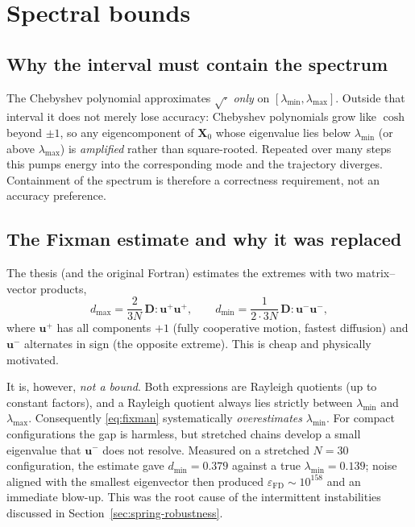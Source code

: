 \documentclass[11pt,a4paper]{report}
\newcommand{\D}{\bm{D}}
\begin{document}
\section{Spectral bounds}
\label{sec:spectral-bounds}

\subsection{Why the interval must contain the spectrum}

The Chebyshev polynomial approximates $\sqrt{\cdot}$ \emph{only} on
$[\lambda_{\min},\lambda_{\max}]$. Outside that interval it does not merely lose
accuracy: Chebyshev polynomials grow like $\cosh$ beyond $\pm1$, so any
eigencomponent of $\bm{X}_0$ whose eigenvalue lies below $\lambda_{\min}$ (or
above $\lambda_{\max}$) is \emph{amplified} rather than square-rooted. Repeated
over many steps this pumps energy into the corresponding mode and the trajectory
diverges. Containment of the spectrum is therefore a correctness requirement, not
an accuracy preference.

\subsection{The Fixman estimate and why it was replaced}

The thesis (and the original Fortran) estimates the extremes with two
matrix--vector products,
\begin{equation}
  d_{\max} = \frac{2}{3N}\,\D : \bm{u}^{+}\bm{u}^{+},
  \qquad
  d_{\min} = \frac{1}{2\cdot 3N}\,\D : \bm{u}^{-}\bm{u}^{-},
  \label{eq:fixman}
\end{equation}
where $\bm{u}^{+}$ has all components $+1$ (fully cooperative motion, fastest
diffusion) and $\bm{u}^{-}$ alternates in sign (the opposite extreme). This is
cheap and physically motivated.

It is, however, \emph{not a bound}. Both expressions are Rayleigh quotients (up
to constant factors), and a Rayleigh quotient always lies strictly between
$\lambda_{\min}$ and $\lambda_{\max}$. Consequently \eqref{eq:fixman}
systematically \emph{overestimates} $\lambda_{\min}$. For compact configurations
the gap is harmless, but stretched chains develop a small eigenvalue that
$\bm{u}^{-}$ does not resolve. Measured on a stretched $N=30$ configuration, the
estimate gave $d_{\min} = 0.379$ against a true $\lambda_{\min} = 0.139$; noise
aligned with the smallest eigenvector then produced
$\varepsilon_{\mathrm{FD}} \sim 10^{158}$ and an immediate blow-up. This was the
root cause of the intermittent instabilities discussed in
Section~\ref{sec:spring-robustness}.
\end{document}
